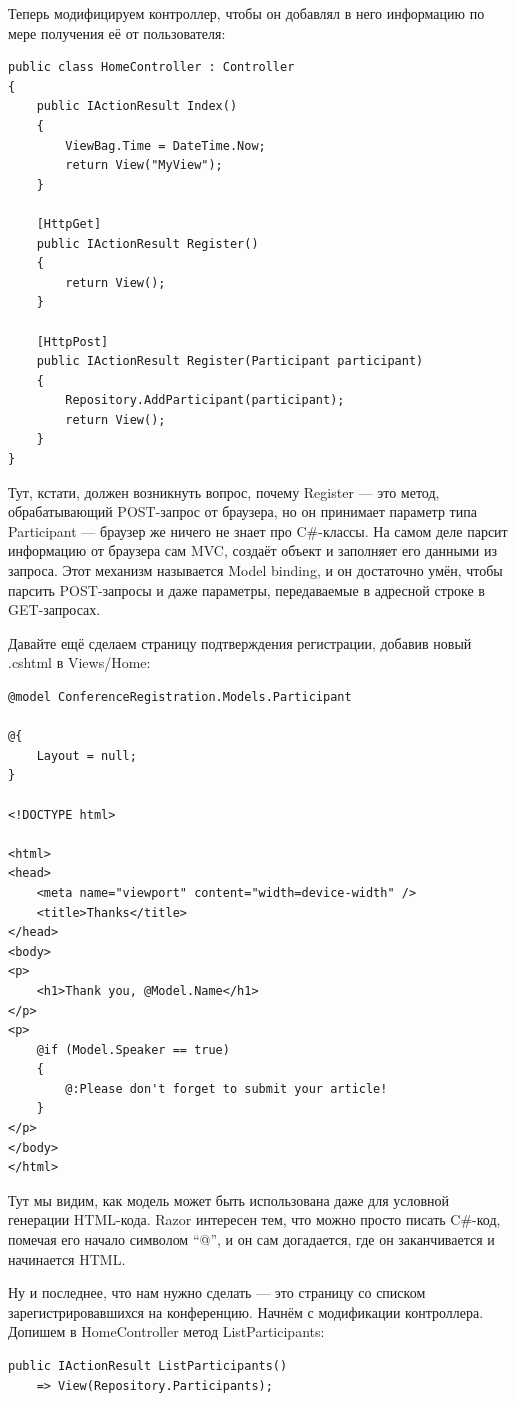 \documentclass[a5paper]{article}
\begin{document}
Теперь модифицируем контроллер, чтобы он добавлял в него информацию по мере получения её от пользователя:

\begin{verbatim}
public class HomeController : Controller
{
    public IActionResult Index()
    {
        ViewBag.Time = DateTime.Now;
        return View("MyView");
    }

    [HttpGet]
    public IActionResult Register()
    {
        return View();
    }

    [HttpPost]
    public IActionResult Register(Participant participant)
    {
        Repository.AddParticipant(participant);
        return View();
    }
}
\end{verbatim}

Тут, кстати, должен возникнуть вопрос, почему Register --- это метод, обрабатывающий POST-запрос от браузера, но он принимает параметр типа Participant --- браузер же ничего не знает про C\#-классы. На самом деле парсит информацию от браузера сам MVC, создаёт объект и заполняет его данными
из запроса. Этот механизм называется Model binding, и он достаточно умён, чтобы парсить POST-запросы и даже параметры, передаваемые в адресной строке в GET-запросах.

Давайте ещё сделаем страницу подтверждения регистрации, добавив новый .cshtml в Views/Home:

\begin{verbatim}
@model ConferenceRegistration.Models.Participant

@{
    Layout = null;
}

<!DOCTYPE html>

<html>
<head>
    <meta name="viewport" content="width=device-width" />
    <title>Thanks</title>
</head>
<body>
<p>
    <h1>Thank you, @Model.Name</h1>
</p>
<p>
    @if (Model.Speaker == true)
    {
        @:Please don't forget to submit your article!
    }
</p>
</body>
</html>
\end{verbatim}

Тут мы видим, как модель может быть использована даже для условной генерации HTML-кода. Razor интересен тем, что можно просто писать C\#-код, помечая его начало символом ``@'', и он сам догадается, где он заканчивается и начинается HTML.

Ну и последнее, что нам нужно сделать --- это страницу со списком зарегистрировавшихся на конференцию. Начнём с модификации контроллера. Допишем в HomeController метод ListParticipants:
\begin{verbatim}
public IActionResult ListParticipants()
    => View(Repository.Participants);
\end{verbatim}
\end{document}

